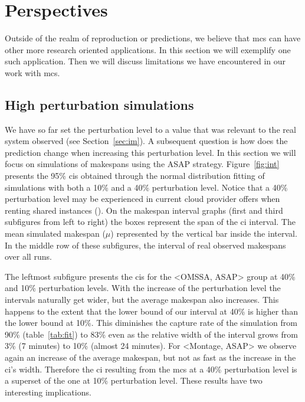 \documentclass[10pt,conference,compsocconf]{IEEEtran}
\begin{document}
\section{Perspectives}
\label{sec:disc}
Outside of the realm of reproduction or predictions, we believe that \ac{mcs}
can have other more research oriented applications. In this section we will
exemplify one such application. Then we will discuss limitations we have
encountered in our work with \ac{mcs}.

\subsection{High perturbation simulations}\label{sec:sa}

We have so  far set the perturbation level  to a value that was  relevant to the
real system observed  (see Section~\ref{sec:im}).  A subsequent  question is how
does the prediction change when increasing this perturbation level. In this
section we will focus on simulations of makespans using the ASAP strategy.
Figure~\ref{fig:int} presents the 95\% \acp{ci} obtained through the normal
distribution fitting of simulations with both a 10\%
and a 40\% perturbation  level. Notice that a 40\% perturbation level may be experienced in
current cloud provider offers when renting shared instances
(\cite{LeitnerC16}). On the makespan interval graphs  (first and third
subfigures  from left  to right)  the boxes  represent the  span of the \ac{ci}
interval. The mean simulated makespan ($\mu{}$) represented by the vertical bar
inside the interval. In the middle row of these subfigures, the interval of 
real observed  makespans over all runs.

The leftmost subfigure presents the \acp{ci} for the <OMSSA, ASAP> group at
40\% and 10\% perturbation levels. With the increase of the perturbation level
the intervals naturally get wider, but the average makespan also increases. 
This happens to the 
extent that the lower bound of our interval at 40\% is higher than the lower
bound at 10\%. This diminishes the capture rate of the simulation from 90\%
(table~\ref{tab:fit}) to 83\% even as the relative width of the interval grows
from 3\% (7 minutes) to 10\% (almost 24 minutes). For <Montage, ASAP> we observe
again an increase of the average makespan, but not as fast as the increase in
the \ac{ci}'s width. Therefore the \ac{ci} resulting from the \ac{mcs} at a
40\% perturbation level is a superset of the one at 10\% perturbation level.
These results have two interesting implications.
\end{document}
